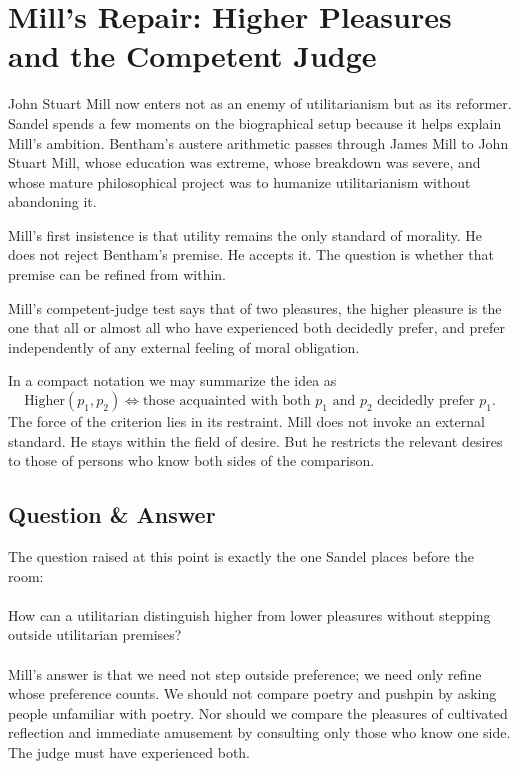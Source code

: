 \section{Mill's Repair: Higher Pleasures and the Competent Judge}

John Stuart Mill now enters not as an enemy of utilitarianism but as its reformer. Sandel spends a few moments on the biographical setup because it helps explain Mill's ambition. Bentham's austere arithmetic passes through James Mill to John Stuart Mill, whose education was extreme, whose breakdown was severe, and whose mature philosophical project was to humanize utilitarianism without abandoning it.

Mill's first insistence is that utility remains the only standard of morality. He does not reject Bentham's premise. He accepts it. The question is whether that premise can be refined from within.

\begin{definition}
Mill's competent-judge test says that of two pleasures, the higher pleasure is the one that all or almost all who have experienced both decidedly prefer, and prefer independently of any external feeling of moral obligation.
\end{definition}

In a compact notation we may summarize the idea as
\begin{equation}
\text{Higher}(p_1,p_2)
\iff
\text{those acquainted with both }p_1\text{ and }p_2\text{ decidedly prefer }p_1.
\end{equation}
The force of the criterion lies in its restraint. Mill does not invoke an external standard. He stays within the field of desire. But he restricts the relevant desires to those of persons who know both sides of the comparison.

\subsection{Question \& Answer}

The question raised at this point is exactly the one Sandel places before the room:

\paragraph{}
How can a utilitarian distinguish higher from lower pleasures without stepping outside utilitarian premises?

\paragraph{}
Mill's answer is that we need not step outside preference; we need only refine whose preference counts. We should not compare poetry and pushpin by asking people unfamiliar with poetry. Nor should we compare the pleasures of cultivated reflection and immediate amusement by consulting only those who know one side. The judge must have experienced both.

